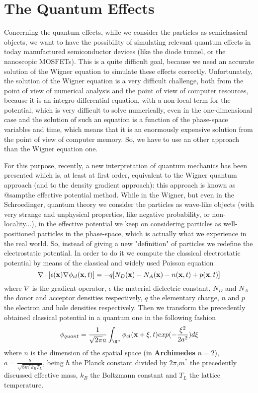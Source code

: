 \documentclass[12pt]{book}
\begin{document}
\section{The Quantum Effects}

Concerning the quantum effects, while we consider the particles as semiclassical objects, we want to have the possibility of simulating relevant quantum effects in today manufactured semiconductor devices (like the diode tunnel, or the nanoscopic MOSFETs). This is a quite difficult goal, because we need an accurate solution of the Wigner equation to simulate these effects correctly. Unfortunately, the solution of the Wigner equation is a very difficult challenge, both from the point of view of numerical analysis and the point of view of computer resources, because it is an integro-differential equation, with a non-local term for the potential, which is very difficult to solve numerically, even in the one-dimensional case and the solution of such an equation is a function of the phase-space variables and time, which means that it is an enormously expensive solution from the point of view of computer memory. So, we have to use an other approach than the Wigner equation one.

For this purpose, recently, a new interpretation of quantum mechanics has been presented which is, at least at first order, equivalent to the Wigner quantum approach (and to the density gradient approach): this approach is known as @samp{the effective potential method}. While in the Wigner, but even in the Schroedinger, quantum theory we consider the particles as wave-like objects (with very strange and unphysical properties, like negative probability, or non-locality...), in the effective potential we keep on considering particles as well-positioned particles in the phase-space, which is actually what we experience in the real world. So, instead  of giving a new "definition" of particles we redefine the electrostatic potential. In order to do it we compute the classical electrostatic potential by means of the classical and widely used Poisson equation
\begin{equation}
 \nabla \cdot [ \epsilon ({\bf{x}}) \nabla \phi_{cl} ({\bf{x}},t) ] = 
 - q [ N_D({\bf{x}}) - N_A({\bf{x}}) - n({\bf{x}},t) + p({\bf{x}},t)]
\end{equation}
where $\nabla$ is the gradient operator, $\epsilon$ the material dielectric constant, $N_D$ and $N_A$ the donor and acceptor densities respectively, $q$ the elementary charge, $n$ and $p$ the electron and hole densities respectively.
Then we transform the precedently obtained classical potential in a quantum one in the following fashion
\begin{equation}
 \phi_{quant} = \frac{1}{\sqrt{2 \pi} a} \int_{\R^n}
 \phi_{cl} ({\bf{x}}+{\bf{\xi}},t) exp(-\frac{\xi^2}{2 a^2}) d\xi
\end{equation}
where $n$ is the dimension of the spatial space (in \textbf{Archimedes} $n=2$), $a=\frac{\hbar}{\sqrt{8 m^* k_B T_L}}$, being $\hbar$ the Planck constant divided by $2 \pi$,$m^*$ the precedently discussed effective mass, $k_B$ the Boltzmann constant and $T_L$ the lattice temperature.
\end{document}
